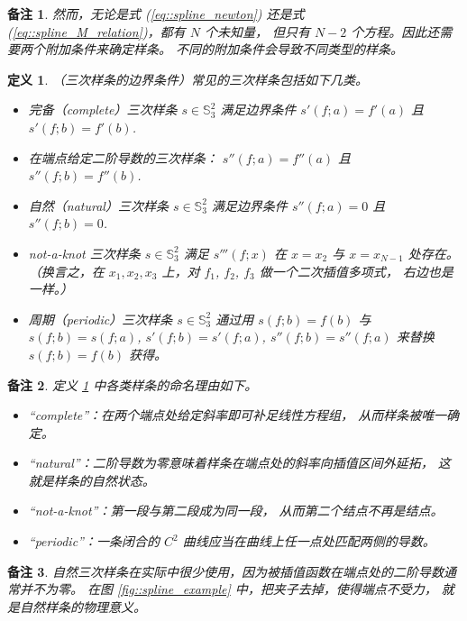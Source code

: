 \documentclass[a4paper]{ctexart}
\newtheorem{remark}{备注}
\newtheorem{definition}[theorem]{定义} %
\numberwithin{theorem}{section}
\numberwithin{equation}{section}
\numberwithin{figure}{section}
\numberwithin{remark}{section}
\begin{document}
\begin{remark}
然而，无论是式 (\ref{eq::spline_newton}) 
还是式 (\ref{eq::spline_M_relation})，都有 $N$ 个未知量，
但只有 $N-2$ 个方程。因此还需要两个附加条件来确定样条。
不同的附加条件会导致不同类型的样条。
\end{remark}

\begin{definition}
    \label{def::spline_boundary_conditions}
（三次样条的边界条件）常见的三次样条包括如下几类。
\begin{itemize}
\item 完备（complete）三次样条 $s\in \mathbb{S}_3^{2}$ 
满足边界条件 $s'(f;a)=f'(a)$ 且 $s'(f;b)=f'(b)$.
\item 在端点给定二阶导数的三次样条：
$s''(f;a)=f''(a)$ 且 $s''(f;b)=f''(b)$.
\item 自然（natural）三次样条 $s\in \mathbb{S}_3^{2}$ 
满足边界条件 $s''(f;a)=0$ 且 $s''(f;b)=0$.
\item not-a-knot 三次样条 $s\in \mathbb{S}_3^{2}$ 满足 $s'''(f;x)$ 
在 $x=x_2$ 与 $x=x_{N-1}$ 处存在。
（换言之，在 $x_1, x_2, x_3$ 上，对 $f_1$, $f_2$, $f_3$ 做一个二次插值多项式，
右边也是一样。）
\item 周期（periodic）三次样条 $s\in \mathbb{S}_3^{2}$ 
通过用 $s(f;b)=f(b)$ 与 $s(f;b)=s(f;a)$, $s'(f;b)=s'(f;a)$, 
$s''(f;b)=s''(f;a)$ 来替换 $s(f;b)=f(b)$ 获得。
\end{itemize}
\end{definition}

\begin{remark}
定义 \ref{def::spline_boundary_conditions} 中各类样条的命名理由如下。
\begin{itemize}
\item “complete”：在两个端点处给定斜率即可补足线性方程组，
从而样条被唯一确定。
\item “natural”：二阶导数为零意味着样条在端点处的斜率向插值区间外延拓，
这就是样条的自然状态。
\item “not-a-knot”：第一段与第二段成为同一段，
从而第二个结点不再是结点。
\item “periodic”：一条闭合的 $C^2$ 
曲线应当在曲线上任一点处匹配两侧的导数。
\end{itemize}
\end{remark}

\begin{remark}
自然三次样条在实际中很少使用，因为被插值函数在端点处的二阶导数通常并不为零。
在图 \ref{fig::spline_example} 中，把夹子去掉，使得端点不受力，
就是自然样条的物理意义。
\end{remark}
\end{document}
